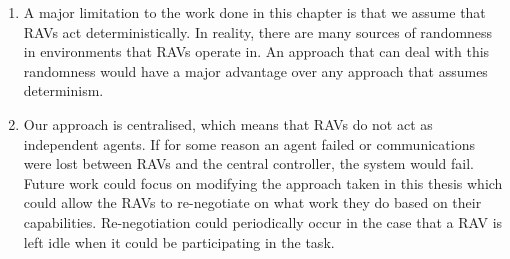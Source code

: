 \begin{enumerate}

    \item A major limitation to the work done in this chapter is that we assume that RAVs act deterministically. In reality, there are many sources of randomness in environments that RAVs operate in. An approach that can deal with this randomness would have a major advantage over any approach that assumes determinism.
    
    \item Our approach is centralised, which means that RAVs do not act as independent agents. If for some reason an agent failed or communications were lost between RAVs and the central controller, the system would fail. Future work could focus on modifying the approach taken in this thesis which could allow the RAVs to re-negotiate on what work they do based on their capabilities. Re-negotiation could periodically occur in the case that a RAV is left idle when it could be participating in the task.
    

\end{enumerate}

